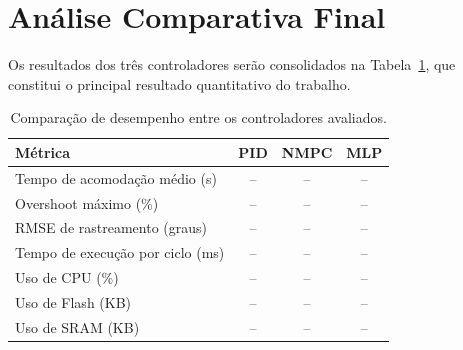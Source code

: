 \section{Análise Comparativa Final}

Os resultados dos três controladores serão consolidados na Tabela~\ref{tab:comparacao_controladores}, que constitui o principal resultado quantitativo do trabalho.

\begin{table}[h]
    \centering
    \caption{Comparação de desempenho entre os controladores avaliados.}
    \label{tab:comparacao_controladores}
    \begin{tabularx}{\textwidth}{Xccc}
        \hline
        \textbf{Métrica} & \textbf{PID} & \textbf{NMPC} & \textbf{MLP} \\
        \hline
        Tempo de acomodação médio (s)   & -- & -- & -- \\
        Overshoot máximo (\%)           & -- & -- & -- \\
        RMSE de rastreamento (graus)    & -- & -- & -- \\
        Tempo de execução por ciclo (ms)& -- & -- & -- \\
        Uso de CPU (\%)                 & -- & -- & -- \\
        Uso de Flash (KB)               & -- & -- & -- \\
        Uso de SRAM (KB)                & -- & -- & -- \\
        \hline
    \end{tabularx}
\end{table}